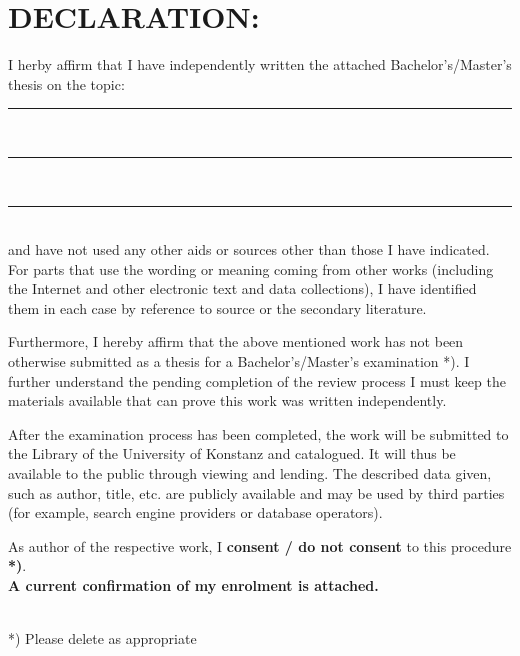 \section*{DECLARATION:}
\ifodd\thepage
\edef\leftmark{DECLARATION}
\edef\rightmark{}
\else
\edef\rightmark{DECLARATION}
\edef\leftmark{}
\fi
I herby affirm that I have independently written the attached Bachelor’s/Master’s
thesis on the topic:\\ 

\noindent
\rule{\linewidth}{0.4pt}\\[0.5cm]%
\rule{\linewidth}{0.4pt}\\[0.5cm]%
\rule{\linewidth}{0.4pt}\\[0.5cm]%
\noindent
and have not used any other aids or sources other than those I have indicated.\\

\noindent
For parts that use the wording or meaning coming from other works (including the
Internet and other electronic text and data collections), I have identified them in each
case by reference to source or the secondary literature.

\noindent
Furthermore, I hereby affirm that the above mentioned work has not been otherwise
submitted as a thesis for a Bachelor’s/Master’s examination *). I further understand
the pending completion of the review process I must keep the materials available that
can prove this work was written independently.

\noindent
After the examination process has been completed, the work will be submitted to the
Library of the University of Konstanz and catalogued. It will thus be available to the
public through viewing and lending. The described data given, such as author, title,
etc. are publicly available and may be used by third parties (for example, search
engine providers or database operators). 

\noindent
As author of the respective  work, I \textbf{consent / do not consent} to this procedure \textbf{*)}.\\

\noindent
\textbf{A current confirmation of my enrolment is attached.}\\[0.6cm]

\noindent
{}\\

*) Please delete as appropriate
\cleardoublepage
